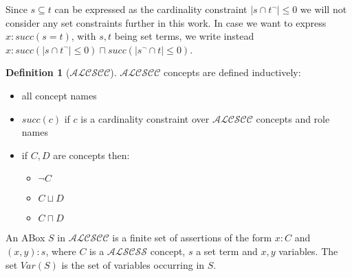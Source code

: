\documentclass[a4paper,11pt]{scrartcl}
\theoremstyle{break}
\theoremstyle{definition}
\newtheorem{mydef}{Definition}
\begin{document}
Since $s\subseteq t$ can be expressed as the cardinality constraint $|s\cap t^\neg|\leq 0$ we will not consider any set constraints further in this work. In case we want to express $x:succ(s=t)$, with $s,t$ being set terms, we write instead $x:succ(|s\cap t^\neg|\leq 0)\sqcap succ(|s^\neg\cap t|\leq 0)$.
\begin{mydef}[$\mathcal{ALCSCC}$]
$\mathcal{ALCSCC}$ concepts are defined inductively:
\begin{itemize}
\item all concept names
\item $succ(c)$ if $c$ is a cardinality constraint over $\mathcal{ALCSCC}$ concepts and role names
\item if $C,D$ are concepts then:
\begin{itemize}
\item $\neg C$
\item $C\sqcup D$
\item $C\sqcap D$
\end{itemize}
\end{itemize}
\end{mydef}
An ABox $S$ in $\mathcal{ALCSCC}$ is a finite set of assertions of the form $x:C$ and $(x,y):s$, where $C$ is a $\mathcal{ALSCSS}$ concept, $s$ a set term and $x,y$ variables. The set $Var(S)$ is the set of variables occurring in $S$. 
\end{document}
